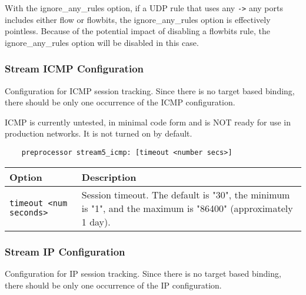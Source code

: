 \documentclass[english]{report}
\newenvironment{note}{
\samepage
    \vspace{10pt}{\textsf{
        {\hspace{7pt}\Huge{$\triangle$\hspace{-12.5pt}{\Large{$^!$}}}}\hspace{5pt}
        {\Large{NOTE}}
    }
    }
   \begin{center}
    \par\vspace{-17pt}

    \begin{lrbox}{\savepar}
    \begin{minipage}[r]{6in}
}
{
    \end{minipage}
    \end{lrbox}
    \fbox{
        \usebox{
            \savepar
	}
    }
    \par\vskip10pt
    \end{center}
}
\newenvironment{note}{
        \begin{rawhtml}
        <p><table border="1"><tr><td><b>
        Note:&nbsp;&nbsp;</b>
        \end{rawhtml}
}{
        \begin{rawhtml}
        </b></td></tr></table></p>
        \end{rawhtml}
}
\begin{document}
\begin{note}

With the ignore\_any\_rules option, if a UDP rule that uses any \texttt{->} any
ports includes either flow or flowbits, the ignore\_any\_rules option is
effectively pointless.  Because of the potential impact of disabling a flowbits
rule, the ignore\_any\_rules option will be disabled in this case.

\end{note}

\subsubsection{Stream ICMP Configuration}

Configuration for ICMP session tracking.  Since there is no target based
binding, there should be only one occurrence of the ICMP configuration.

\begin{note}

ICMP is currently untested, in minimal code form and is NOT ready for use in
production networks.  It is not turned on by default.

\end{note}

\begin{verbatim}
    preprocessor stream5_icmp: [timeout <number secs>]
\end{verbatim}

\begin{center}
\begin{tabular}{| l | p{4.5in} |}

\hline
\textbf{Option} & \textbf{Description}\\
\hline 

\hline 
\texttt{timeout <num seconds>} &

Session timeout.  The default is "30", the minimum is "1", and the maximum is
"86400" (approximately 1 day).\\

\hline
\end{tabular}
\end{center}

\subsubsection{Stream IP Configuration}

Configuration for IP session tracking.  Since there is no target based
binding, there should be only one occurrence of the IP configuration.
\end{document}
